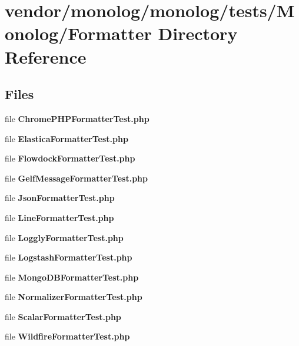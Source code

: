 \section{vendor/monolog/monolog/tests/\+Monolog/\+Formatter Directory Reference}
\label{dir_e35b7b7fcbfb24813693f045fe6ba040}
\subsection*{Files}
\begin{DoxyCompactItemize}
\item 
file {\bf Chrome\+P\+H\+P\+Formatter\+Test.\+php}
\item 
file {\bf Elastica\+Formatter\+Test.\+php}
\item 
file {\bf Flowdock\+Formatter\+Test.\+php}
\item 
file {\bf Gelf\+Message\+Formatter\+Test.\+php}
\item 
file {\bf Json\+Formatter\+Test.\+php}
\item 
file {\bf Line\+Formatter\+Test.\+php}
\item 
file {\bf Loggly\+Formatter\+Test.\+php}
\item 
file {\bf Logstash\+Formatter\+Test.\+php}
\item 
file {\bf Mongo\+D\+B\+Formatter\+Test.\+php}
\item 
file {\bf Normalizer\+Formatter\+Test.\+php}
\item 
file {\bf Scalar\+Formatter\+Test.\+php}
\item 
file {\bf Wildfire\+Formatter\+Test.\+php}
\end{DoxyCompactItemize}
